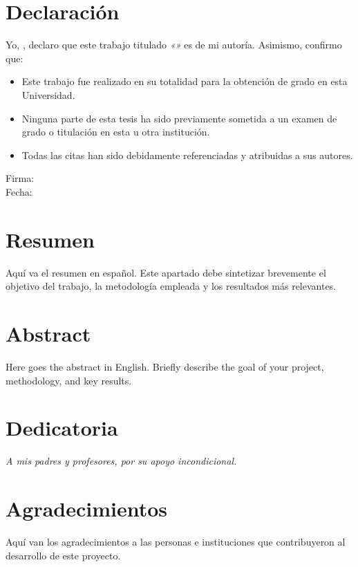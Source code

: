 \documentclass[12pt,titlepage,twoside,openright]{book}
\makeatletter
\def\cleardoublepage{\clearpage\if@twoside \ifodd\c@page\else
\hbox{}
\thispagestyle{empty}
\newpage
\if@twocolumn\hbox{}\newpage\fi\fi\fi}
\makeatother
\begin{document}
\chapter*{Declaración}
\thispagestyle{empty}
Yo, \elnombre, declaro que este trabajo titulado
\textit{«\eltitulo»} es de mi autoría. Asimismo, confirmo que:
\begin{itemize}
	\item Este trabajo fue realizado en su totalidad para la obtención de grado en esta Universidad.
	\item Ninguna parte de esta tesis ha sido previamente sometida a un examen de grado o titulación en esta u otra institución.
	\item Todas las citas han sido debidamente referenciadas y atribuidas a sus autores.
\end{itemize}
\vfill
\begin{flushright}
	Firma: \underline{\hspace{5cm}}\\[0.5cm]
	Fecha: \underline{\hspace{5cm}}
\end{flushright}
\cleardoublepage

\chapter*{Resumen}
Aquí va el resumen en español. Este apartado debe sintetizar brevemente el objetivo del trabajo, la metodología empleada y los resultados más relevantes.
\cleardoublepage

\chapter*{Abstract}
Here goes the abstract in English. Briefly describe the goal of your project, methodology, and key results.
\cleardoublepage

\chapter*{Dedicatoria}
\begin{flushright}
	\textit{A mis padres y profesores, por su apoyo incondicional.}
\end{flushright}
\cleardoublepage

\chapter*{Agradecimientos}
Aquí van los agradecimientos a las personas e instituciones que contribuyeron al desarrollo de este proyecto.
\cleardoublepage
\end{document}
